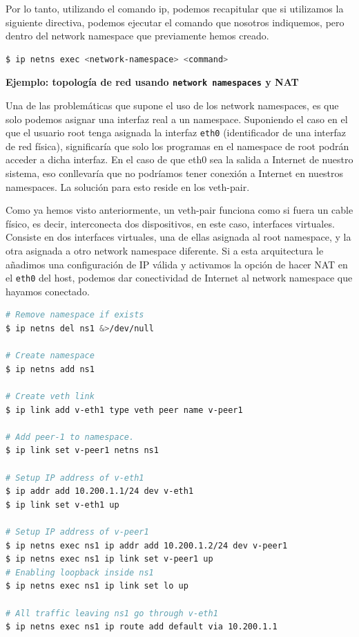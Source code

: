 \documentclass[a4paper, oneside, 12pt]{book}
\begin{document}
	\par \noindent Por lo tanto, utilizando el comando ip, podemos recapitular que si utilizamos la siguiente directiva, podemos ejecutar el comando que nosotros indiquemos, pero dentro del network namespace que previamente hemos creado.
	\begin{lstlisting}[language=bash, caption=Ejecutar cualquier programa con un network namespace]
$ ip netns exec <network-namespace> <command>
	\end{lstlisting}

	\pagebreak
	
	\noindent \textbf{\large Ejemplo: topología de red usando \texttt{network namespaces} y NAT}\\
	\par \noindent Una de las problemáticas que supone el uso de los network namespaces, es que solo podemos asignar una interfaz real a un namespace. Suponiendo el caso en el que el usuario root tenga asignada la interfaz \texttt{eth0} (identificador de una interfaz de red física), significaría que solo los programas en el namespace de root podrán acceder a dicha interfaz. En el caso de que eth0 sea la salida a Internet de nuestro sistema, eso conllevaría que no podríamos tener conexión a Internet en nuestros namespaces. La solución para esto reside en los veth-pair. \\
	
	
	\par \noindent Como ya hemos visto anteriormente, un veth-pair funciona como si fuera un cable físico, es decir, interconecta dos dispositivos, en este caso, interfaces virtuales. Consiste en dos interfaces virtuales, una de ellas asignada al root namespace, y la otra asignada a otro network namespace diferente. Si a esta arquitectura le añadimos una configuración de IP válida y activamos la opción de hacer NAT en el \texttt{eth0} del host, podemos dar conectividad de Internet al network namespace que hayamos conectado.
	
	\addvspace{10px}
	
	\begin{lstlisting}[language=bash, caption=Ejemplo configuración de NAT entre eth0 y veth]
# Remove namespace if exists
$ ip netns del ns1 &>/dev/null

# Create namespace
$ ip netns add ns1

# Create veth link
$ ip link add v-eth1 type veth peer name v-peer1

# Add peer-1 to namespace.
$ ip link set v-peer1 netns ns1

# Setup IP address of v-eth1
$ ip addr add 10.200.1.1/24 dev v-eth1
$ ip link set v-eth1 up

# Setup IP address of v-peer1
$ ip netns exec ns1 ip addr add 10.200.1.2/24 dev v-peer1
$ ip netns exec ns1 ip link set v-peer1 up
# Enabling loopback inside ns1
$ ip netns exec ns1 ip link set lo up

# All traffic leaving ns1 go through v-eth1
$ ip netns exec ns1 ip route add default via 10.200.1.1
	\end{lstlisting}
	
\end{document}
